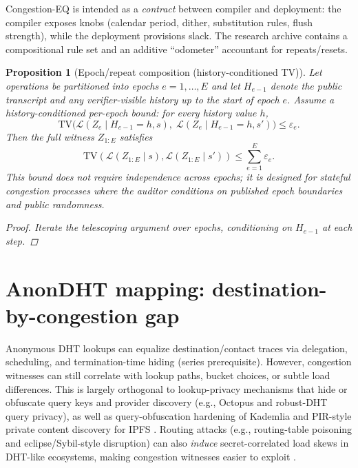\documentclass[11pt]{article}
\newtheorem{proposition}{Proposition}
\theoremstyle{definition}
\theoremstyle{remark}
\newcommand{\TV}{\mathrm{TV}}
\newcommand{\eps}{\varepsilon}
\begin{document}
Congestion-EQ is intended as a \emph{contract} between compiler and deployment: the compiler exposes knobs (calendar period, dither, substitution rules, flush strength), while the deployment provisions slack.
The research archive contains a compositional rule set and an additive ``odometer'' accountant for repeats/resets.

\begin{proposition}[Epoch/repeat composition (history-conditioned TV)]\label{prop:epochcomp}
Let operations be partitioned into epochs $e=1,\dots,E$ and let $H_{e-1}$ denote the public transcript and any verifier-visible history up to the start of epoch $e$.
Assume a history-conditioned per-epoch bound: for every history value $h$,
\[
\TV\big(\mathcal{L}(Z_e\mid H_{e-1}=h, s),\;\mathcal{L}(Z_e\mid H_{e-1}=h, s')\big) \le \eps_e.
\]
Then the full witness $Z_{1:E}$ satisfies
\[
\TV(\mathcal{L}(Z_{1:E}\mid s),\mathcal{L}(Z_{1:E}\mid s')) \le \sum_{e=1}^E \eps_e.
\]
This bound does not require independence across epochs; it is designed for stateful congestion processes where the auditor conditions on published epoch boundaries and public randomness.

\begin{proof}
Iterate the telescoping argument over epochs, conditioning on $H_{e-1}$ at each step.
\end{proof}
\end{proposition}

\section{AnonDHT mapping: destination-by-congestion gap}
Anonymous DHT lookups can equalize destination/contact traces via delegation, scheduling, and termination-time hiding (series prerequisite).
However, congestion witnesses can still correlate with lookup paths, bucket choices, or subtle load differences.
This is largely orthogonal to 
lookup-privacy mechanisms that hide or obfuscate query keys and provider discovery (e.g., Octopus and robust-DHT query privacy),
as well as query-obfuscation hardening of Kademlia and PIR-style private content discovery for IPFS \cite{octopus,add_query_privacy,kademlia_obfuscation,peer2pir,ipfs_triplehash}.
Routing attacks (e.g., routing-table poisoning and eclipse/Sybil-style disruption) can also \emph{induce} secret-correlated load skews in DHT-like ecosystems, making congestion witnesses easier to exploit \cite{ipfs_totaleclipse,singh_eclipse2006,wang_sybil_bittorrent2012}.
\end{document}
